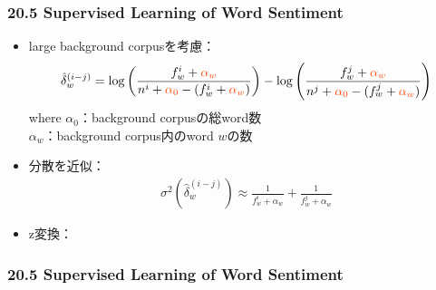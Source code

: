 \begin{frame}
    \frametitle{20.5 Supervised Learning of Word Sentiment}
    \begin{itemize}
        \item large background corpusを考慮：
        {\small
            \begin{align*}
                \hat{\delta}^{(i-j)}_{w} =
                    \log\left(\frac{f^{i}_{w} + \yorangetxt{\alpha_{w}}}{n^i + \yorangetxt{\alpha_{0}}-(f^{i}_{w} + \yorangetxt{\alpha_{w}})}\right)
                    - \log\left(\frac{f^{j}_{w} + \yorangetxt{\alpha_{w}}}{n^j + \yorangetxt{\alpha_{0}}-(f^{j}_{w} + \yorangetxt{\alpha_{w}})}\right)
            \end{align*}
        }
        {\footnotesize
            where $\alpha_0$：background corpusの総word数 \\
                 $\alpha_w$：background corpus内のword $w$の数
        }
    \end{itemize}
    \begin{itemize}
        \item 分散を近似：
        {\small
            \begin{align*}
                \sigma^{2}\left(\hat{\delta}^{(i-j)}_{w}\right) \approx \frac{1}{f^{i}_{w} + \alpha_{w}} + \frac{1}{f^{j}_{w} + \alpha_{w}}
            \end{align*}
        }
    \end{itemize}
    \begin{itemize}
        \item z変換：
        {\small
            \begin{yalign*}
            \end{yalign*}
        }
    \end{itemize}
\end{frame}


\begin{frame}
    \frametitle{20.5 Supervised Learning of Word Sentiment}
\end{frame}
